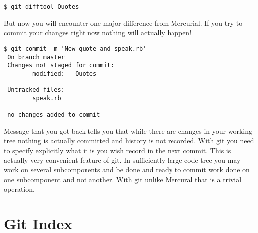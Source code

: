 \documentclass{article}
\theoremstyle{definition}
\begin{document}
        \begin{Verbatim}[frame=single]
 $ git difftool Quotes
        \end{Verbatim}
        But now you will encounter one major difference from Mercurial. If you try to commit your changes right now
        nothing will actually happen!

    \begin{Verbatim}[frame=single]
 $ git commit -m 'New quote and speak.rb'
 On branch master
 Changes not staged for commit:
        modified:   Quotes

 Untracked files:
        speak.rb

 no changes added to commit
        \end{Verbatim}
        Message that you got back tells you that while there are changes in your working tree nothing is actually
        committed and history is not recorded. With git you need to specify explicitly what it is you wish record
        in the next commit. This is actually very convenient feature of git. In sufficiently large code tree you may
        work on several subcomponents and be done and ready to commit work done on one subcomponent and not another.
        With git unlike Mercural that is a trivial operation.

        \section{Git Index}
\end{document}
